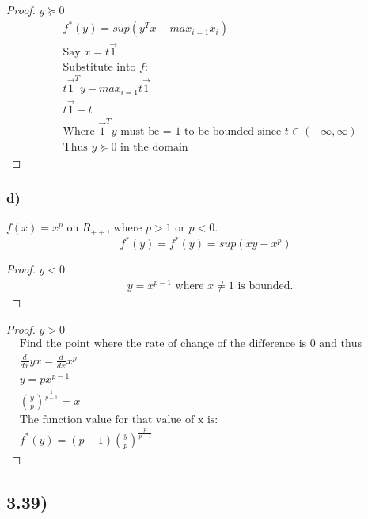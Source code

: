 \documentclass[12pt]{article}
\begin{document}
\begin{proof}{$y \succeq 0$}
\begin{align*}
& f^*(y) = sup(y^Tx - max_{i=1}x_i)\\
& \text{Say } x = t\overrightarrow{1}\\
& \text{Substitute into $f$:}\\
& t\overrightarrow{1}^Ty-max_{i=1}t\overrightarrow{1}\\
& t\overrightarrow{1}-t\\
& \text{Where } \overrightarrow{1}^Ty \text{ must be = 1 to be bounded since $t\in(-\infty, \infty)$}\\
& \text{Thus $y \succeq 0$ in the domain}
\end{align*}
\end{proof}

\subsubsection*{d)}
$f(x) = x^p$ on $R_{++}$, where $p>1$ or $p<0$.
$$f^*(y) = f^*(y) = sup(xy - x^p)$$
\begin{proof}{$y < 0$}
\begin{align*}
& y = x^{p-1} \text{ where } x\not=1 \text{ is bounded.}
\end{align*}
\end{proof}

\begin{proof}{$y > 0$}
\begin{align*}
& \text{Find the point where the rate of change of the difference is 0 and thus bounded:}\\
& \frac{d}{dx}yx = \frac{d}{dx}x^p\\
& y = px^{p-1}\\
& (\frac{y}{p})^{\frac{1}{p-1}} = x\\
& \text{The function value for that value of x is: }\\
& f^*(y) = (p-1)(\frac{y}{p})^{\frac{p}{p-1}}
\end{align*}
\end{proof}

\subsection*{3.39)}
\end{document}
